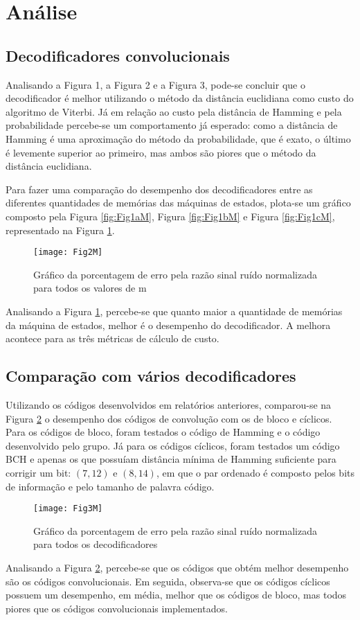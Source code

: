 \section{Análise}

\subsection{Decodificadores convolucionais}

Analisando a Figura 1, a Figura 2 e a Figura 3, pode-se concluir que o decodificador é melhor utilizando o método da distância euclidiana como custo do algoritmo de Viterbi. Já em relação ao custo pela distância de Hamming e pela probabilidade percebe-se um comportamento já esperado: como a distância de Hamming é uma aproximação do método da probabilidade, que é exato, o último é levemente superior ao primeiro, mas ambos são piores que o método da distância euclidiana.

Para fazer uma comparação do desempenho dos decodificadores entre as diferentes quantidades de memórias das máquinas de estados, plota-se um gráfico composto pela Figura \ref{fig:Fig1aM}, Figura \ref{fig:Fig1bM} e Figura \ref{fig:Fig1cM}, representado na Figura \ref{fig:Fig2M}.

\begin{figure}[H]
	\centering
	\texttt{[image: Fig2M]}
	\captionsetup{font=scriptsize}
	\caption{Gráfico da porcentagem de erro pela razão sinal ruído normalizada para todos os valores de m\label{fig:Fig2M}}
\end{figure}

Analisando a Figura \ref{fig:Fig2M}, percebe-se que quanto maior a quantidade de memórias da máquina de estados, melhor é o desempenho do decodificador. A melhora acontece para as três métricas de cálculo de custo.

\subsection{Comparação com vários decodificadores}

Utilizando os códigos desenvolvidos em relatórios anteriores, comparou-se na Figura \ref{fig:Fig3M} o desempenho dos códigos de convolução com os de bloco e cíclicos. Para os códigos de bloco, foram testados o código de Hamming e o código desenvolvido pelo grupo. Já para os códigos cíclicos, foram testados um código BCH  e apenas os que possuíam distância mínima de Hamming suficiente para corrigir um bit: $(7,12)$ e $(8,14)$, em que o par ordenado é composto pelos bits de informação e pelo tamanho de palavra código.

\begin{figure}[H]
	\centering
	\texttt{[image: Fig3M]}
	\captionsetup{font=scriptsize}
	\caption{Gráfico da porcentagem de erro pela razão sinal ruído normalizada para todos os decodificadores\label{fig:Fig3M}}
\end{figure}

Analisando a Figura \ref{fig:Fig3M}, percebe-se que os códigos que obtém melhor desempenho são os códigos convolucionais. Em seguida, observa-se que os códigos cíclicos possuem um desempenho, em média, melhor que os códigos de bloco, mas todos piores que os códigos convolucionais implementados.